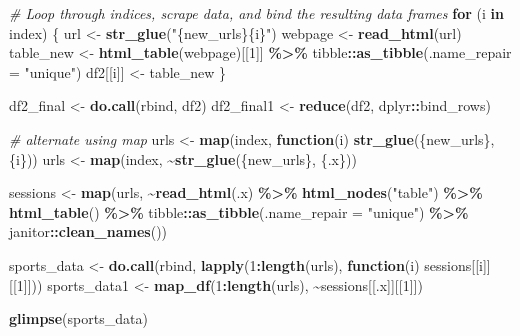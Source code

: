 \documentclass[
]{book}
\newenvironment{Shaded}{\begin{snugshade}}{\end{snugshade}}
\newcommand{\AttributeTok}[1]{\textcolor[rgb]{0.13,0.29,0.53}{#1}}
\newcommand{\CommentTok}[1]{\textcolor[rgb]{0.56,0.35,0.01}{\textit{#1}}}
\newcommand{\ControlFlowTok}[1]{\textcolor[rgb]{0.13,0.29,0.53}{\textbf{#1}}}
\newcommand{\DecValTok}[1]{\textcolor[rgb]{0.00,0.00,0.81}{#1}}
\newcommand{\FunctionTok}[1]{\textcolor[rgb]{0.13,0.29,0.53}{\textbf{#1}}}
\newcommand{\NormalTok}[1]{#1}
\newcommand{\OtherTok}[1]{\textcolor[rgb]{0.56,0.35,0.01}{#1}}
\newcommand{\SpecialCharTok}[1]{\textcolor[rgb]{0.81,0.36,0.00}{\textbf{#1}}}
\newcommand{\StringTok}[1]{\textcolor[rgb]{0.31,0.60,0.02}{#1}}
\begin{document}
\begin{Shaded}
\begin{Highlighting}[]
\CommentTok{\# Loop through indices, scrape data, and bind the resulting data frames}
\ControlFlowTok{for}\NormalTok{ (i }\ControlFlowTok{in}\NormalTok{ index) \{}
\NormalTok{  url }\OtherTok{\textless{}{-}} \FunctionTok{str\_glue}\NormalTok{(}\StringTok{"\{new\_urls\}\{i\}"}\NormalTok{)}
\NormalTok{  webpage }\OtherTok{\textless{}{-}} \FunctionTok{read\_html}\NormalTok{(url)}
\NormalTok{  table\_new }\OtherTok{\textless{}{-}} \FunctionTok{html\_table}\NormalTok{(webpage)[[}\DecValTok{1}\NormalTok{]] }\SpecialCharTok{\%\textgreater{}\%}
\NormalTok{    tibble}\SpecialCharTok{::}\FunctionTok{as\_tibble}\NormalTok{(}\AttributeTok{.name\_repair =} \StringTok{"unique"}\NormalTok{)}
\NormalTok{  df2[[i]] }\OtherTok{\textless{}{-}}\NormalTok{ table\_new}
\NormalTok{\}}

\NormalTok{df2\_final }\OtherTok{\textless{}{-}} \FunctionTok{do.call}\NormalTok{(rbind, df2)}
\NormalTok{df2\_final1 }\OtherTok{\textless{}{-}} \FunctionTok{reduce}\NormalTok{(df2, dplyr}\SpecialCharTok{::}\NormalTok{bind\_rows)}
\end{Highlighting}
\end{Shaded}

\begin{Shaded}
\begin{Highlighting}[]
\CommentTok{\# alternate using map}
\NormalTok{urls }\OtherTok{\textless{}{-}} \FunctionTok{map}\NormalTok{(index, }\ControlFlowTok{function}\NormalTok{(i) }\FunctionTok{str\_glue}\NormalTok{(\{new\_urls\}, \{i\}))}
\NormalTok{urls }\OtherTok{\textless{}{-}} \FunctionTok{map}\NormalTok{(index, }\SpecialCharTok{\textasciitilde{}}\FunctionTok{str\_glue}\NormalTok{(\{new\_urls\}, \{.x\}))}


\NormalTok{sessions }\OtherTok{\textless{}{-}} \FunctionTok{map}\NormalTok{(urls, }\SpecialCharTok{\textasciitilde{}}\FunctionTok{read\_html}\NormalTok{(.x) }\SpecialCharTok{\%\textgreater{}\%} 
                  \FunctionTok{html\_nodes}\NormalTok{(}\StringTok{"table"}\NormalTok{) }\SpecialCharTok{\%\textgreater{}\%} 
                  \FunctionTok{html\_table}\NormalTok{() }\SpecialCharTok{\%\textgreater{}\%} 
\NormalTok{                  tibble}\SpecialCharTok{::}\FunctionTok{as\_tibble}\NormalTok{(}\AttributeTok{.name\_repair =} \StringTok{"unique"}\NormalTok{) }\SpecialCharTok{\%\textgreater{}\%} 
\NormalTok{                  janitor}\SpecialCharTok{::}\FunctionTok{clean\_names}\NormalTok{())}

\NormalTok{sports\_data }\OtherTok{\textless{}{-}} \FunctionTok{do.call}\NormalTok{(rbind, }\FunctionTok{lapply}\NormalTok{(}\DecValTok{1}\SpecialCharTok{:}\FunctionTok{length}\NormalTok{(urls), }\ControlFlowTok{function}\NormalTok{(i) sessions[[i]][[}\DecValTok{1}\NormalTok{]]))}
\NormalTok{sports\_data1 }\OtherTok{\textless{}{-}} \FunctionTok{map\_df}\NormalTok{(}\DecValTok{1}\SpecialCharTok{:}\FunctionTok{length}\NormalTok{(urls), }\SpecialCharTok{\textasciitilde{}}\NormalTok{sessions[[.x]][[}\DecValTok{1}\NormalTok{]])}

\FunctionTok{glimpse}\NormalTok{(sports\_data)}
\end{Highlighting}
\end{Shaded}
\end{document}
